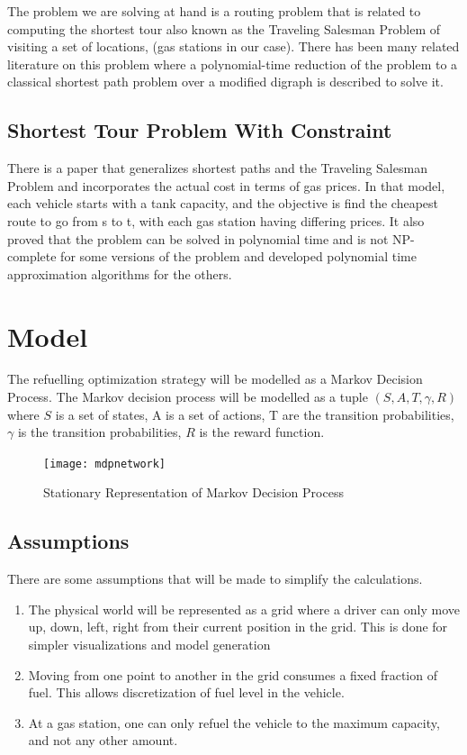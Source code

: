\documentclass[10pt,twocolumn,letterpaper]{article}
\begin{document}
The problem we are solving at hand is a routing problem that is related to computing the shortest tour also known as the Traveling Salesman Problem of visiting a set of locations, (gas stations in our case). There has been many related literature on this problem\cite{festa2012complexity, festa2013solving} where a polynomial-time reduction of the problem to a classical shortest path problem over a modified digraph is described to solve it.

\subsection{Shortest Tour Problem With Constraint}

There is a paper that generalizes shortest paths and the Traveling Salesman Problem and incorporates the actual cost in terms of gas prices\cite{khuller2007fill}. In that model, each vehicle starts with a tank capacity, and the objective is find the cheapest route to go from s to t, with each gas station having differing prices. It also proved that the problem can be solved in polynomial time and is not NP-complete for some versions of the problem and developed polynomial time approximation algorithms for the others. 

\section{Model}

The refuelling optimization strategy will be modelled as a Markov Decision Process. The Markov decision process will be modelled as a tuple $(S,A,T, \gamma, R)$ where $S$ is a set of states, A is a set of actions, T are the transition probabilities, $\gamma$ is the transition probabilities, $R$ is the reward function.\\

\begin{figure}[h]
\begin{center}
\texttt{[image: mdpnetwork]}
\end{center}
   \caption{Stationary Representation of Markov Decision Process\cite{kochenderfer2015decision}}
\label{fig:long}
\label{fig:onecol}
\end{figure}


\subsection{Assumptions}
There are some assumptions that will be made to simplify the calculations.
\begin{enumerate}
\item The physical world will be represented as a grid where a driver can only move up, down, left, right from their current position in the grid. This is done for simpler visualizations and model generation
\item Moving from one point to another in the grid consumes a fixed fraction of fuel. This allows discretization of fuel level in the vehicle.
\item At a gas station, one can only refuel the vehicle to the maximum capacity, and not any other amount.
\end{enumerate}
\end{document}
